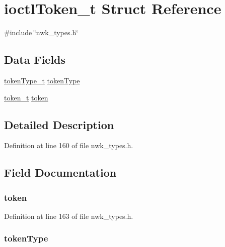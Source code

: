 \hypertarget{structioctlToken__t}{\section{ioctl\-Token\-\_\-t \-Struct \-Reference}
\label{structioctlToken__t}
}


{\ttfamily \#include \char`\"{}nwk\-\_\-types.\-h\char`\"{}}

\subsection*{\-Data \-Fields}
\begin{DoxyCompactItemize}
\item 
\hyperlink{nwk__types_8h_a3369a43c2500da7fabaa8d4b8effb706}{token\-Type\-\_\-t} \hyperlink{structioctlToken__t_a79dabe0f00ed3a1ff15901ad3723f16a}{token\-Type}
\item 
\hyperlink{uniontoken__t}{token\-\_\-t} \hyperlink{structioctlToken__t_a6730f3039f1596a8af51447e361caae5}{token}
\end{DoxyCompactItemize}


\subsection{\-Detailed \-Description}


\-Definition at line 160 of file nwk\-\_\-types.\-h.



\subsection{\-Field \-Documentation}
\hypertarget{structioctlToken__t_a6730f3039f1596a8af51447e361caae5}{
\subsubsection[{token}]{ {\bf token}}}\label{structioctlToken__t_a6730f3039f1596a8af51447e361caae5}


\-Definition at line 163 of file nwk\-\_\-types.\-h.

\hypertarget{structioctlToken__t_a79dabe0f00ed3a1ff15901ad3723f16a}{
\subsubsection[{token\-Type}]{ {\bf token\-Type}}}\label{structioctlToken__t_a79dabe0f00ed3a1ff15901ad3723f16a}



